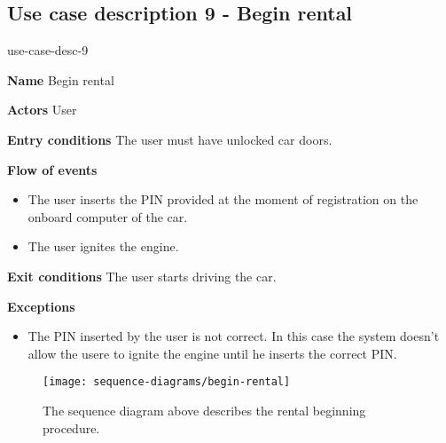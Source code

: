 \subsection{Use case description 9 - Begin rental}
\begin{labeling}{use-case-desc-9}
	\item[\textbf{Name}] Begin rental
	\item[\textbf{Actors}] User
	\item[\textbf{Entry conditions}] The user must have unlocked car doors.
	\item[\textbf{Flow of events}]
		\begin{itemize}
			\item[]
			\item The user inserts the PIN provided at the moment of registration on the onboard computer of the car.
			\item The user ignites the engine.
		\end{itemize}
	\item[\textbf{Exit conditions}] The user starts driving the car.
	\item[\textbf{Exceptions}]
		\begin{itemize}
			\item[]
			\item The PIN inserted by the user is not correct. In this case the system doesn't allow the usere to ignite the engine until he inserts the correct PIN. 
		\end{itemize}
\end{labeling}
\begin{figure}[H]
	\centering
	\texttt{[image: sequence-diagrams/begin-rental]}
	\caption[Sequence diagram - Begin rental]{The sequence diagram above describes the rental beginning procedure.}
	\label{fig:begin-rental-sequence-diagram}
\end{figure}
\clearpage

